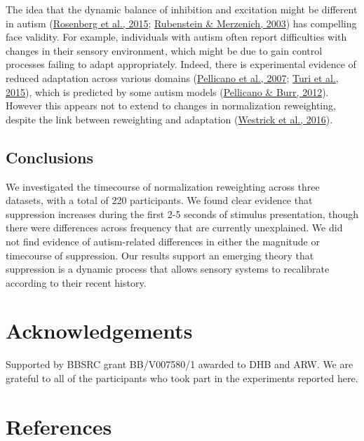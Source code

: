 \documentclass[
]{article}
\begin{document}
The idea that the dynamic balance of inhibition and excitation might be different in autism (\protect\hyperlink{ref-Rosenberg2015}{Rosenberg et al., 2015}; \protect\hyperlink{ref-Rubenstein2003}{Rubenstein \& Merzenich, 2003}) has compelling face validity. For example, individuals with autism often report difficulties with changes in their sensory environment, which might be due to gain control processes failing to adapt appropriately. Indeed, there is experimental evidence of reduced adaptation across various domains (\protect\hyperlink{ref-Pellicano2007}{Pellicano et al., 2007}; \protect\hyperlink{ref-Turi2015}{Turi et al., 2015}), which is predicted by some autism models (\protect\hyperlink{ref-Pellicano2012}{Pellicano \& Burr, 2012}). However this appears not to extend to changes in normalization reweighting, despite the link between reweighting and adaptation (\protect\hyperlink{ref-Westrick2016}{Westrick et al., 2016}).

\hypertarget{conclusions}{%
\subsection{Conclusions}\label{conclusions}}

We investigated the timecourse of normalization reweighting across three datasets, with a total of 220 participants. We found clear evidence that suppression increases during the first 2-5 seconds of stimulus presentation, though there were differences across frequency that are currently unexplained. We did not find evidence of autism-related differences in either the magnitude or timecourse of suppression. Our results support an emerging theory that suppression is a dynamic process that allows sensory systems to recalibrate according to their recent history.

\hypertarget{acknowledgements}{%
\section{Acknowledgements}\label{acknowledgements}}

Supported by BBSRC grant BB/V007580/1 awarded to DHB and ARW. We are grateful to all of the participants who took part in the experiments reported here.

\hypertarget{references}{%
\section*{References}\label{references}}
\end{document}
